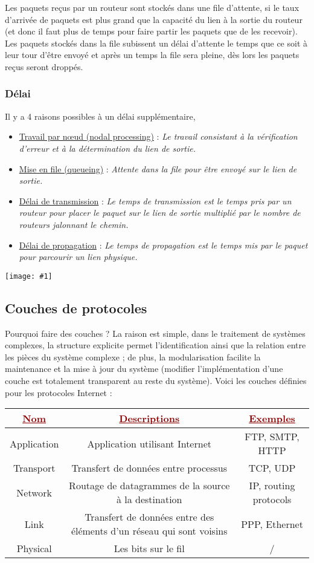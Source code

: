 \documentclass{article}
\newcommand{\dred}[1]{\textcolor{darkred}{\textbf{#1}}}
\newcommand{\ora}[1]{\textcolor{darko}{#1}}
\newcommand{\imgR}[2]{\begin{center}\texttt{[image: \#1]}\end{center}}
\newcommand{\point}[2]{\item \ora{\underline{#1}} : \textit{#2}}
\begin{document}
Les paquets reçus par un routeur sont stockés dans une file d'attente, si le taux d'arrivée de paquets est plus
grand que la capacité du lien à la sortie du routeur (et donc il faut plus de temps pour faire partir les paquets
que de les recevoir). Les paquets stockés dans la file subissent un délai d'attente le temps que ce soit à leur
tour d'être envoyé et après un temps la file sera pleine, dès lors les paquets reçus seront droppés.

\subsubsection{Délai}

Il y a 4 raisons possibles à un délai supplémentaire,
\begin{itemize}
\point{Travail par n\oe ud (nodal processing)}{Le travail consistant à la vérification d'erreur et à la
détermination du lien de sortie.}
\point{Mise en file (queueing)}{Attente dans la file pour être envoyé sur le lien de sortie.}
\point{Délai de transmission}{Le temps de transmission est le temps pris par un routeur pour placer le paquet 
sur le lien de sortie multiplié par le nombre de routeurs jalonnant le chemin.}
\point{Délai de propagation}{Le temps de propagation est le temps mis par le paquet pour parcourir un lien 
physique.}
\end{itemize}

\imgR{CN_007.png}{300}

\subsection{Couches de protocoles}

Pourquoi faire des couches ? La raison est simple, dans le traitement de systèmes complexes, la structure 
explicite permet l'identification ainsi que la relation entre les pièces du système complexe ; de plus, la 
modularisation facilite la maintenance et la mise à jour du système (modifier l'implémentation d'une couche est 
totalement transparent au reste du système). Voici les couches définies pour les protocoles Internet : 

\begin{center}
	\begin{tabular}{|*{3}{c|}}
	\hline
	\dred{\underline{Nom}} & \dred{\underline{Descriptions}} & \dred{\underline{Exemples}} \\
	\hline
	Application & Application utilisant Internet & FTP, SMTP, HTTP\\
	\hline
	Transport & Transfert de données entre processus & TCP, UDP\\
	\hline
	Network & Routage de datagrammes de la source à la destination & IP, routing protocols\\
	\hline
	Link & Transfert de données entre des éléments d'un réseau qui sont voisins & PPP, Ethernet\\
	\hline
	Physical & Les bits sur le fil & /\\
	\hline
	\end{tabular}
\end{center}
\end{document}
